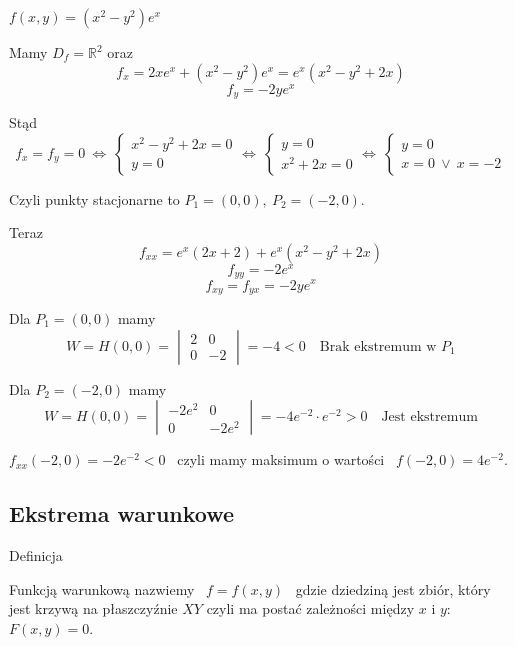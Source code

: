 \begin{przyklad}
    $ f(x,y) = (x^2 - y^2)e^x $
    
    Mamy $ D_f = \mathbb{R}^2 $ oraz
    $$ f_x = 2xe^x + (x^2 - y^2)e^x = e^x(x^2 - y^2 + 2x) $$
    $$ f_y = -2ye^x $$

    Stąd
    $$ f_x = f_y = 0 \ \Leftrightarrow \ \begin{cases} x^2 - y^2 + 2x = 0 \\ y = 0 \end{cases} \Leftrightarrow \
    \begin{cases} y = 0 \\ x^2 + 2x = 0 \end{cases} \Leftrightarrow \ \begin{cases} y = 0 \\ x = 0 \ \lor \ x=-2 \end{cases} $$

    Czyli punkty stacjonarne to $ P_1 = (0,0), \ P_2 = (-2, 0) $.

    Teraz
    $$ f_{xx} = e^x(2x + 2) + e^x(x^2 - y^2 + 2x) $$
    $$ f_{yy} = -2e^x $$
    $$ f_{xy} = f_{yx} = -2ye^x $$

    Dla $ P_1 = (0,0) $ mamy
    $$ W = H(0,0) = \begin{vmatrix} 2 & 0 \\ 0 & -2 \end{vmatrix} = -4 < 0 \quad \textrm{Brak ekstremum w } P_1 $$

    Dla $ P_2 = (-2, 0) $ mamy
    $$ W = H(0,0) = \begin{vmatrix} -2e^2 & 0 \\ 0 & -2e^2 \end{vmatrix} = -4e^{-2} \cdot e^{-2} > 0 \quad \textrm{Jest ekstremum} $$

    $ f_{xx}(-2, 0) = -2e^{-2} < 0 $ \ czyli mamy maksimum o wartości \ $ f(-2, 0) = 4e^{-2} $.
\end{przyklad}

\subsection*{Ekstrema warunkowe}

\begin{tw}{Definicja}

Funkcją warunkową nazwiemy \ $ f = f(x,y) $ \ gdzie dziedziną jest zbiór, który jest krzywą na płaszczyźnie $XY$ czyli ma postać zależności
między $x$ i $y$: \ $F(x,y) = 0$.
\end{tw}

